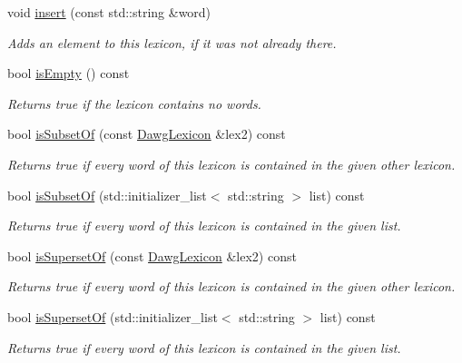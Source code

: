 \begin{DoxyCompactItemize}
void \mbox{\hyperlink{classDawgLexicon_a1a017af6eb755b5c83e70f61e2bda2c7}{insert}} (const std\+::string \&word)
\begin{DoxyCompactList}\small\item\em Adds an element to this lexicon, if it was not already there. \end{DoxyCompactList}\item 
bool \mbox{\hyperlink{classDawgLexicon_acf82f9b2937375c7b1cf3dccb3df3312}{is\+Empty}} () const
\begin{DoxyCompactList}\small\item\em Returns {\ttfamily true} if the lexicon contains no words. \end{DoxyCompactList}\item 
bool \mbox{\hyperlink{classDawgLexicon_adbfb8a4218cbe3c3686cd58e63bb9193}{is\+Subset\+Of}} (const \mbox{\hyperlink{classDawgLexicon}{Dawg\+Lexicon}} \&lex2) const
\begin{DoxyCompactList}\small\item\em Returns {\ttfamily true} if every word of this lexicon is contained in the given other lexicon. \end{DoxyCompactList}\item 
bool \mbox{\hyperlink{classDawgLexicon_a2a0f1241b53bcf0b31103b79cb01b87d}{is\+Subset\+Of}} (std\+::initializer\+\_\+list$<$ std\+::string $>$ list) const
\begin{DoxyCompactList}\small\item\em Returns {\ttfamily true} if every word of this lexicon is contained in the given list. \end{DoxyCompactList}\item 
bool \mbox{\hyperlink{classDawgLexicon_a16ee2d6dbb050435a7f5cf4dd0cc777c}{is\+Superset\+Of}} (const \mbox{\hyperlink{classDawgLexicon}{Dawg\+Lexicon}} \&lex2) const
\begin{DoxyCompactList}\small\item\em Returns {\ttfamily true} if every word of this lexicon is contained in the given other lexicon. \end{DoxyCompactList}\item 
bool \mbox{\hyperlink{classDawgLexicon_a217cbc1e6ba9f694645608c8a17c1943}{is\+Superset\+Of}} (std\+::initializer\+\_\+list$<$ std\+::string $>$ list) const
\begin{DoxyCompactList}\small\item\em Returns {\ttfamily true} if every word of this lexicon is contained in the given list. \end{DoxyCompactList}\item 

\end{DoxyCompactItemize}
